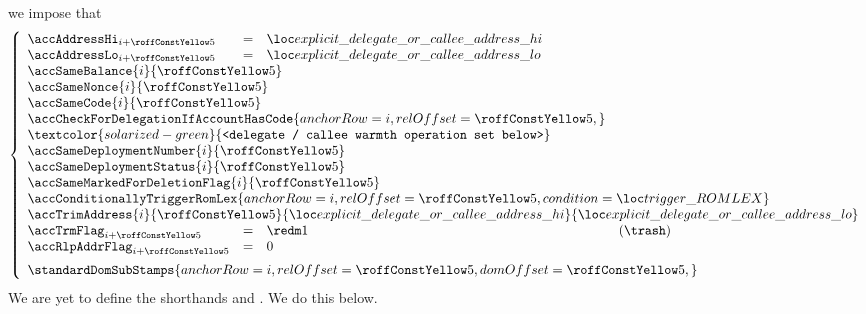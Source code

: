 \item[\underline{\underline{First \delegateName{} / \calleeName{} account-row $n^°(i + \callFirstDelegateOrCalleeAccountRowOffset)$:}}]
	we impose that
	\[
		\left\{ \begin{array}{lcll}
			\accAddressHi _{i + \callFirstDelegateOrCalleeAccountRowOffset } & = & \locExplicitDelegateOrCalleeAddressHi \\
			\accAddressLo _{i + \callFirstDelegateOrCalleeAccountRowOffset } & = & \locExplicitDelegateOrCalleeAddressLo \\
			\multicolumn{4}{l}{\accSameBalance               {i}{\callFirstDelegateOrCalleeAccountRowOffset}} \\
			\multicolumn{4}{l}{\accSameNonce                 {i}{\callFirstDelegateOrCalleeAccountRowOffset}} \\
			\multicolumn{4}{l}{\accSameCode                  {i}{\callFirstDelegateOrCalleeAccountRowOffset}} \\
			\multicolumn{3}{l}{\accCheckForDelegationIfAccountHasCode {
				anchorRow = i                                          ,
				relOffset = \callFirstDelegateOrCalleeAccountRowOffset ,
			}} \\
			\multicolumn{4}{l}{\textcolor{solarized-green}{\texttt{<delegate / callee warmth operation set below>}}} \\
			\multicolumn{4}{l}{\accSameDeploymentNumber      {i}{\callFirstDelegateOrCalleeAccountRowOffset}} \\
			\multicolumn{4}{l}{\accSameDeploymentStatus      {i}{\callFirstDelegateOrCalleeAccountRowOffset}} \\
			\multicolumn{4}{l}{\accSameMarkedForDeletionFlag {i}{\callFirstDelegateOrCalleeAccountRowOffset}} \\
			\multicolumn{4}{l}{\accConditionallyTriggerRomLex { anchorRow = i, relOffset = \callFirstDelegateOrCalleeAccountRowOffset, condition = \locCallTriggersRomLex } } \\
			\multicolumn{4}{l}{
				\accTrimAddress
				{i}{\callFirstDelegateOrCalleeAccountRowOffset}
				{\locExplicitDelegateOrCalleeAddressHi}
				{\locExplicitDelegateOrCalleeAddressLo}}
			\\
			\accTrmFlag      _{i + \callFirstDelegateOrCalleeAccountRowOffset} & = & \rOne & (\trash) \\
			\accRlpAddrFlag  _{i + \callFirstDelegateOrCalleeAccountRowOffset} & = & 0 \vspace{2mm} \\
			\multicolumn{4}{l}{
				\standardDomSubStamps {
					anchorRow = i                                          ,
					relOffset = \callFirstDelegateOrCalleeAccountRowOffset ,
					domOffset = \callFirstDelegateOrCalleeAccountRowOffset ,
				}
			} \\
		\end{array} \right.
	\]
	\saNote{}
	We are yet to define the shorthands
	\locExplicitDelegateOrCalleeAddressHi{} and
	\locExplicitDelegateOrCalleeAddressLo{}.
	We do this below.


